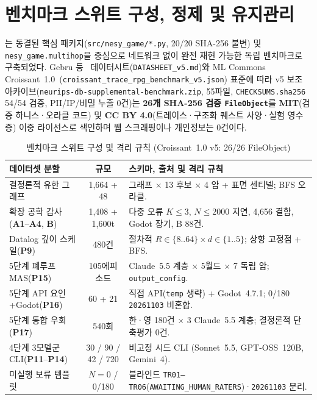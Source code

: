 \section{벤치마크 스위트 구성, 정제 및 유지관리}\label{sec:db-composition}
\system{}는 동결된 핵심 패키지(\texttt{src/nesy\_game/*.py}, 20/20 SHA-256 불변) 및 \texttt{nesy\_game.multihop}을 중심으로 네트워크 없이 완전 재현 가능한 독립 벤치마크로 구축되었다. Gebru 등~\cite{gebru2021datasheets} 데이터시트(\texttt{DATASHEET\_v5.md})와 ML Commons Croissant~1.0~\cite{akhtar2024croissant}(\texttt{croissant\_trace\_rpg\_benchmark\_v5.json}) 표준에 따라 v5 보조 아카이브(\texttt{neurips-db-supplemental-benchmark.zip}, 55파일, \texttt{CHECKSUMS.sha256} 54/54 검증, PII/IP/비밀 누출 0건)는 \textbf{26개 SHA-256 검증 \texttt{FileObject}}를 \textbf{MIT}(검증 하니스·오라클 코드) 및 \textbf{CC BY 4.0}(트레이스·구조화 퀘스트 사양·실험 영수증) 이중 라이선스로 색인하며 웹 스크래핑이나 개인정보는 0건이다.

\begin{table}[!tbp]
\caption{벤치마크 스위트 구성 및 격리 규칙 (Croissant~1.0 v5: 26/26 FileObject)}
\label{tab:phase5-db-comp}
\centering
\scriptsize
\setlength{\tabcolsep}{3pt}
\begin{tabularx}{\columnwidth}{@{}>{\raggedright\arraybackslash}p{}c>{\raggedright\arraybackslash}X@{}}
\toprule
\textbf{데이터셋 분할} & \textbf{규모} & \textbf{스키마, 출처 및 격리 규칙} \\
\midrule
결정론적 유한 그래프 & 1,664 + 48 & 32 그래프 $\times$ 13 후보 $\times$ 4 암 + 표면 센티넬; BFS 오라클. \\
확장 공학 감사(\textbf{A1}--\textbf{A4}, \textbf{B}) & 1,408 + 1,600t & 다중 오류 $K{\le}3$, $N{\le}2000$ 지연, 4,656 결함, Godot 장기, B 88건. \\
Datalog 깊이 스케일(\textbf{P9}) & 480건 & 절차적 $R{\in}\{8..64\}\times d{\in}\{1..5\}$; 상향 고정점 + BFS. \\
5단계 폐루프 MAS(\textbf{P15}) & 105에피소드 & 3 Claude~5.5 계층 $\times$ 5월드 $\times$ 7 독립 암; \texttt{output\_config}. \\
5단계 API 요인+Godot(\textbf{P16}) & 60 + 21 & 직접 API(\texttt{temp} 생략) + Godot~4.7.1; 0/180 \texttt{20261103} 비혼합. \\
5단계 통합 우회(\textbf{P17}) & 540회 & 한·영 180건 $\times$ 3 Claude~5.5 계층; 결정론적 단축평가 0건. \\
4단계 3모델군 CLI(\textbf{P11}--\textbf{P14}) & 30 / 90 / 42 / 720 & 비고정 시드 CLI (Sonnet~5.5, GPT-OSS~120B, Gemini~4). \\
미실행 보류 템플릿 & $N{=}0$ / 0/180 & 블라인드 \texttt{TR01--TR06}(\texttt{AWAITING\_HUMAN\_RATERS})·\texttt{20261103} 분리. \\
\bottomrule
\end{tabularx}
\end{table}

